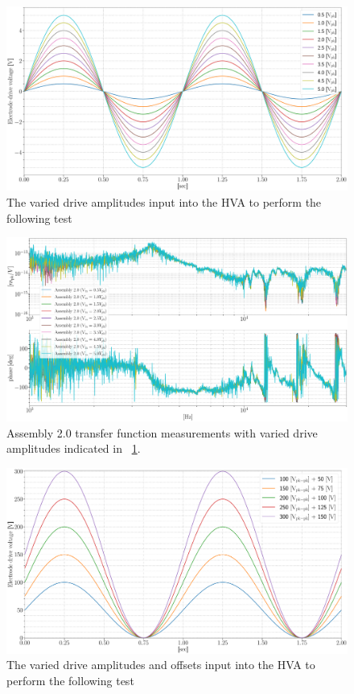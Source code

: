 \begin{figure}[H]
    \includegraphics[width=\textwidth]{figs/ALGAAS/results_figs/assembly2/vary_da.pdf}
    \caption{The varied drive amplitudes input into the HVA to perform the following test}
    \label{fig:vary_da}
\end{figure}

\begin{figure}[H]
    \includegraphics[width=\textwidth]{figs/ALGAAS/results_figs/assembly2/vv53.pdf} 
    \caption{Assembly 2.0 transfer function measurements with varied drive amplitudes indicated in ~\ref{fig:vary_da}.}
    \label{fig:vv53}
\end{figure}


\begin{figure}[H]
    \includegraphics[width=\textwidth]{figs/ALGAAS/results_figs/assembly2/vary_daao.pdf}
    \caption{The varied drive amplitudes and offsets input into the HVA to perform the following test}
    \label{fig:vary_daao}
\end{figure}

